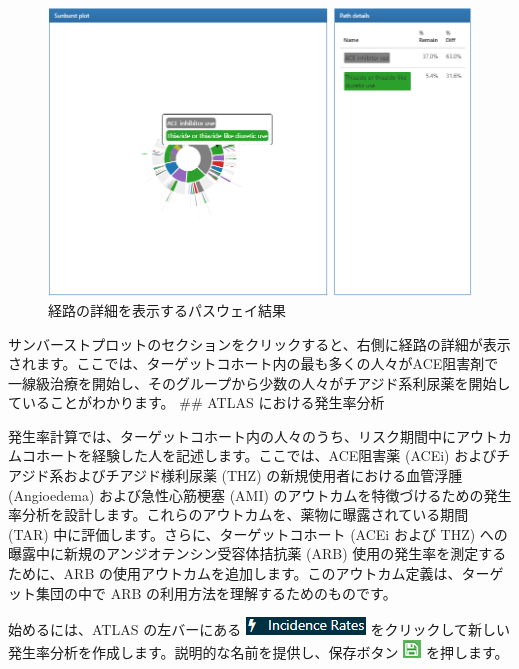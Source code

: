 \documentclass[
  11pt]{book}
\theoremstyle{definition}
\theoremstyle{definition}
\theoremstyle{definition}
\theoremstyle{definition}
\theoremstyle{remark}
\begin{document}
\begin{figure}

{\centering \includegraphics[width=1\linewidth]{images/Characterization/atlasPathwaysResultsPathDetails} 

}

\caption{経路の詳細を表示するパスウェイ結果}\label{fig:atlasPathwaysResultsPathDetails}
\end{figure}

サンバーストプロットのセクションをクリックすると、右側に経路の詳細が表示されます。ここでは、ターゲットコホート内の最も多くの人々がACE阻害剤で一線級治療を開始し、そのグループから少数の人々がチアジド系利尿薬を開始していることがわかります。
\#\# ATLAS における発生率分析

発生率計算では、ターゲットコホート内の人々のうち、リスク期間中にアウトカムコホートを経験した人を記述します。ここでは、ACE阻害薬 (ACEi) およびチアジド系およびチアジド様利尿薬 (THZ) の新規使用者における血管浮腫 (Angioedema) および急性心筋梗塞 (AMI) のアウトカムを特徴づけるための発生率分析を設計します。これらのアウトカムを、薬物に曝露されている期間 (TAR) 中に評価します。さらに、ターゲットコホート (ACEi および THZ) への曝露中に新規のアンジオテンシン受容体拮抗薬 (ARB) 使用の発生率を測定するために、ARB の使用アウトカムを追加します。このアウトカム定義は、ターゲット集団の中で ARB の利用方法を理解するためのものです。

始めるには、ATLAS の左バーにある \includegraphics{images/Characterization/atlasIncidenceMenuItem.png} をクリックして新しい発生率分析を作成します。説明的な名前を提供し、保存ボタン \includegraphics{images/PopulationLevelEstimation/save.png} を押します。
\end{document}
